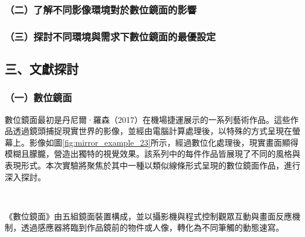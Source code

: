 \documentclass[12pt]{article}
\begin{document}
\subsubsection{（二）了解不同影像環境對於數位鏡面的影響}
\subsubsection{（三）探討不同環境與需求下數位鏡面的最優設定}

\newpage

\subsection{三、文獻探討}

\subsubsection{（一）數位鏡面}

數位鏡面最初是丹尼爾·羅森（2017）在機場捷運展示的一系列藝術作品。這些作品透過鏡頭捕捉現實世界的影像，並經由電腦計算處理後，以特殊的方式呈現在螢幕上。影像如圖\ref{fig:mirror_example_23}所示，經過數位化處理後，現實畫面顯得模糊且朦朧，營造出獨特的視覺效果。該系列中的每件作品皆展現了不同的風格與表現形式。本次實驗將聚焦於其中一種以類似線條形式呈現的數位鏡面作品，進行深入探討。

\

\begin{itshape}
  《數位鏡面》由五組鏡面裝置構成，並以攝影機與程式控制觀眾互動與畫面反應機制，透過感應器將臨到作品鏡前的物件或人像，轉化為不同筆觸的動態速寫。
\end{itshape}

\
\end{document}
